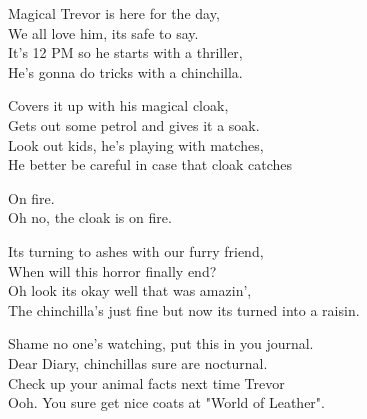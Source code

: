 \vspace{10pt}
Magical Trevor is here for the day,\\
We all love him, its safe to say.\\
It's 12 PM so he starts with a thriller,\\
He's gonna do tricks with a chinchilla.\par
\vspace{10pt}
Covers it up with his magical cloak,\\
Gets out some petrol and gives it a soak.\\
Look out kids, he's playing with matches,\\
He better be careful in case that cloak catches\par
\vspace{10pt}
On fire.\\
Oh no, the cloak is on fire.\par
\vspace{10pt}
Its turning to ashes with our furry friend,\\
When will this horror finally end?\\
Oh look its okay well that was amazin',\\
The chinchilla's just fine but now its turned into a raisin.\par
\vspace{10pt}
Shame no one's watching, put this in you journal.\\
Dear Diary, chinchillas sure are nocturnal.\\
Check up your animal facts next time Trevor\\
Ooh. You sure get nice coats at "World of Leather".
